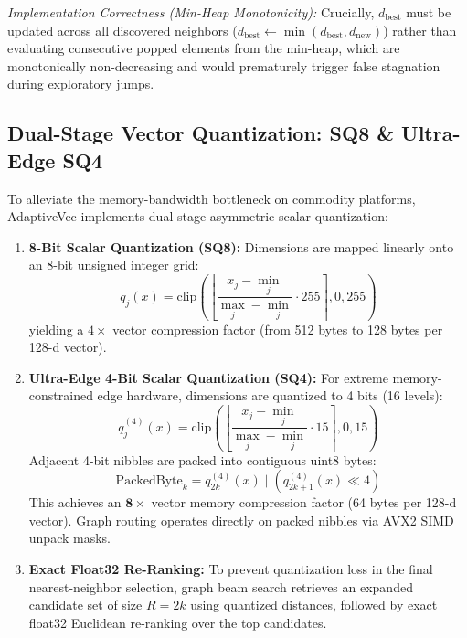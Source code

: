 \documentclass[conference,10pt]{IEEEtran}
\begin{document}
\textit{Implementation Correctness (Min-Heap Monotonicity):} Crucially, $d_{\text{best}}$ must be updated across all discovered neighbors ($d_{\text{best}} \leftarrow \min(d_{\text{best}}, d_{\text{new}})$) rather than evaluating consecutive popped elements from the min-heap, which are monotonically non-decreasing and would prematurely trigger false stagnation during exploratory jumps.

\subsection{Dual-Stage Vector Quantization: SQ8 \& Ultra-Edge SQ4}
To alleviate the memory-bandwidth bottleneck on commodity platforms, AdaptiveVec implements dual-stage asymmetric scalar quantization:
\begin{enumerate}
    \item \textbf{8-Bit Scalar Quantization (SQ8):} Dimensions are mapped linearly onto an 8-bit unsigned integer grid:
    \begin{equation}
    q_j(x) = \text{clip}\left(\left\lfloor \frac{x_j - \min_j}{\max_j - \min_j} \cdot 255 \right\rceil, 0, 255\right)
    \end{equation}
    yielding a $4\times$ vector compression factor (from 512 bytes to 128 bytes per 128-d vector).
    \item \textbf{Ultra-Edge 4-Bit Scalar Quantization (SQ4):} For extreme memory-constrained edge hardware, dimensions are quantized to 4 bits (16 levels):
    \begin{equation}
    q_j^{(4)}(x) = \text{clip}\left(\left\lfloor \frac{x_j - \min_j}{\max_j - \min_j} \cdot 15 \right\rceil, 0, 15\right)
    \end{equation}
    Adjacent 4-bit nibbles are packed into contiguous uint8 bytes:
    \begin{equation}
    \text{PackedByte}_k = q_{2k}^{(4)}(x) \mid \left( q_{2k+1}^{(4)}(x) \ll 4 \right)
    \end{equation}
    This achieves an $\mathbf{8\times}$ vector memory compression factor (64 bytes per 128-d vector). Graph routing operates directly on packed nibbles via AVX2 SIMD unpack masks.
    \item \textbf{Exact Float32 Re-Ranking:} To prevent quantization loss in the final nearest-neighbor selection, graph beam search retrieves an expanded candidate set of size $R = 2k$ using quantized distances, followed by exact float32 Euclidean re-ranking over the top candidates.
\end{enumerate}
\end{document}
